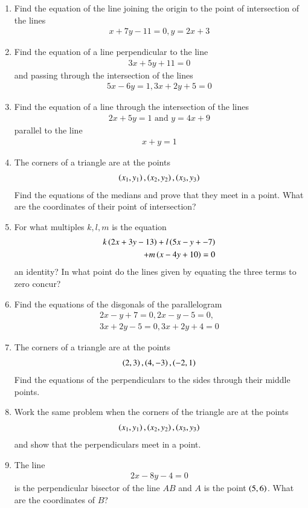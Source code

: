 \begin{enumerate}[1.]
\item Find the equation of the line joining the origin to the point of intersection of the lines
\begin{align*}
x+7y - 11 = 0, y = 2x+3
\end{align*}
\item Find the equation of a line perpendicular to the line
\begin{align*}
3x+5y+11 = 0
\end{align*}
and passing through the intersection of the lines
\begin{align*}
5x - 6y = 1, 3x+2y+5 = 0
\end{align*}
\item Find the equation of a line through the intersection of the lines
\begin{align*}
2x+5y = 1 \text{ and } y = 4x+9
\end{align*}
parallel to the line 
\begin{align*}
x+y = 1
\end{align*}
\item The corners of a triangle are at the points
\begin{align*}
\left(x_1,y_1\right), \left(x_2,y_2\right), \left(x_3,y_3\right)
\end{align*}
Find the equations of the medians and prove that they meet in a point.  What are the coordinates of their point of intersection?
\item For what multiples $k, l, m$ is the equation
\begin{align*}
k\left(2x+3y-13\right)+l\left(5x-y+-7\right) 
\\ + m\left(x-4y+10\right) = 0
\end{align*}
an identity?  In what point do the lines given by equating the three terms to zero concur?
\item Find the equations of the disgonals of the parallelogram
\begin{align*}
2x-y+7 = 0, 2x-y-5 = 0,
\\
 3x+2y-5 = 0, 3x+2y+4=0 
\end{align*}
\item The corners of a triangle are at the points
\begin{align*}
\left(2,3\right), \left(4,-3\right), \left(-2,1\right)
\end{align*}
Find the equations of the perpendiculars to the sides through their middle points.
\item Work the same problem when the corners of the triangle are at the points
\begin{align*}
\left(x_1,y_1\right), \left(x_2,y_2\right), \left(x_3,y_3\right)
\end{align*}
and show that the perpendiculars meet in a point.
\item The line
\begin{align*}
2x-8y-4=0
\end{align*}
is the perpendicular bisector of the line $AB$ and $A$ is the point $\left(5,6\right)$. What are the coordinates of $B$?
\end{enumerate}
